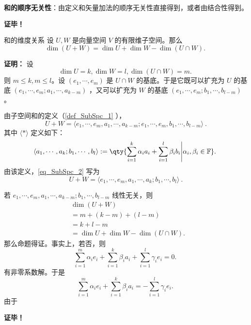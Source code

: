 \textbf{和的顺序无关性}：由定义和矢量加法的顺序无关性直接得到，或者由结合性得到。

\textbf{证毕！}



\begin{theorem}{和的维度关系}
设 $U,W$ 是向量空间 $V$ 的有限维子空间。那么
\begin{equation}
\dim (U+W)=\dim U+\dim W-\dim(U\cap W).~
\end{equation}

\end{theorem}

\textbf{证明：}
设
\begin{equation}
\dim U=k,\dim W=l,\dim(U\cap W)=m.~
\end{equation}
则 $m\leq k,m\leq l$。设 $(e_1,\cdots,e_m)$ 是 $U\cap W$ 的基底。于是它既可以扩充为 $U$ 的基底 $(e_1,\cdots,e_m;a_1,\cdots,a_{k-m})$ ，又可以扩充为 $W$ 的基底 $(e_1,\cdots,e_m;b_1,\cdots,b_{l-m})$。

由子空间和的定义（\autoref{def_SubSpc_1} ），
\begin{equation}\label{eq_SubSpc_2}
U+W=\langle e_1,\cdots,e_m,a_1,\cdots,a_{k-m};e_1,\cdots,e_m,b_1,\cdots,b_{l-m}\rangle~.
\end{equation}
其中 $\langle*\rangle$ 定义如下：
\begin{equation}
\langle a_1,\cdots,a_k;b_1,\cdots,b_l\rangle:=\qty{\sum_{i=1}^k\alpha_i a_i+\sum_{i=1}^l\beta_i b_i\Bigg|\alpha_i,\beta_i\in \mathbb F}.~
\end{equation}
由该定义，\autoref{eq_SubSpc_2} 写为
\begin{equation}
U+W=\langle e_1,\cdots,e_m,a_1,\cdots,a_k;b_1,\cdots,b_l\rangle~.
\end{equation}

若 $e_1,\cdots,e_m,a_1,\cdots,a_{k-m};b_1,\cdots,b_{l-m}$ 线性无关，则
\begin{equation}
\begin{aligned}
&\dim (U+W)\\
&=m+(k-m)+(l-m)\\
&=k+l-m\\
&=\dim U+\dim W-\dim(U\cap W).
\end{aligned}~
\end{equation}
那么命题得证。事实上，若否，则
\begin{equation}
\sum_{i=1}^m\alpha_i e_i+\sum_{i=1}^k\beta_i a_i+\sum_{i=1}^l\gamma_i e_i=0.~
\end{equation}
有非零系数解。于是
\begin{equation}
\sum_{i=1}^m\alpha_i e_i+\sum_{i=1}^k\beta_i a_i=-\sum_{i=1}^l\gamma_i e_i.~
\end{equation}
由于






\textbf{证毕！}



